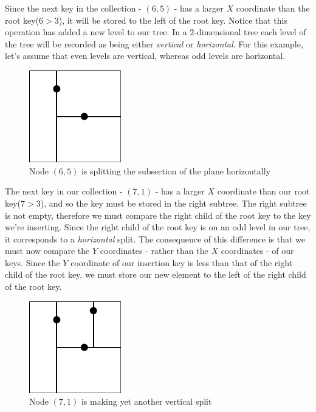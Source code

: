 \documentclass{article}
\begin{document}
Since the next key in the collection - \((6, 5)\) - has a larger \(X\) coordinate than the root key(\(6 > 3\)),
it will be stored to the left of the root key. Notice that this operation has added a new level to our tree.
In a 2-dimensional tree each level of the tree will be recorded as being either {\em vertical} or {\em horizontal}.
For this example, let's assume that even levels are vertical, whereas odd levels are horizontal.

\begin{figure}[H]
  \centering
  \includegraphics[width=4cm]{2d_tree_1}
  \caption{Node \((6, 5)\) is splitting the subsection of the plane horizontally}
\end{figure}

The next key in our collection - \((7, 1)\) - has a larger \(X\) coordinate than our root key(\(7 > 3\)),
and so the key must be stored in the right subtree. The right subtree is not empty,
therefore we must compare the right child of the root key to the key we're inserting.
Since the right child of the root key is on an odd level in our tree, it corresponds to a {\em horizontal} split.
The consequence of this difference is that we must now compare the \(Y\) coordinates - rather than the \(X\)
coordinates - of our keys. Since the \(Y\) coordinate of our insertion key is less than that of the right child
of the root key, we must store our new element to the left of the right child of the root key.

\begin{figure}[H]
  \centering
  \includegraphics[width=4cm]{2d_tree_2}
  \caption{Node \((7, 1)\) is making yet another vertical split}
\end{figure}
\end{document}
